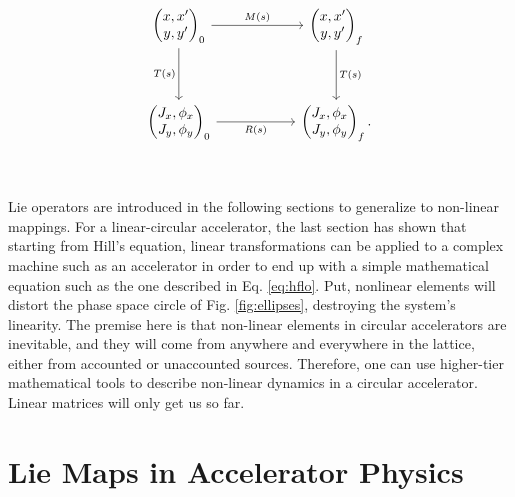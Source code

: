 \begin{equation}\begin{tikzcd}
    {\begin{pmatrix} x,x' \\ y,y' \end{pmatrix}_0} & {} & {\begin{pmatrix} x,x' \\ y,y' \end{pmatrix}_{f}} \\
    \\
    {\begin{pmatrix} J_x,\phi_x \\ J_y,\phi_y \end{pmatrix}_0} & {} & {\begin{pmatrix} J_x,\phi_x \\ J_y,\phi_y \end{pmatrix}_{f}.} \\
    \arrow["{M(s)}", from=1-1, to=1-3]
    \arrow["{T(s)}"', from=1-1, to=3-1]
    \arrow["{R(s)}"', from=3-1, to=3-3]
    \arrow["{T(s)}", from=1-3, to=3-3]
\end{tikzcd}\end{equation}

Lie operators are introduced in the following sections to generalize to non-linear mappings. For a linear-circular accelerator, the last section has shown that starting from Hill's equation, linear transformations can be applied to a complex machine such as an accelerator in order to end up with a simple mathematical equation such as the one described in Eq. \ref{eq:hflo}. Put, nonlinear elements will distort the phase space circle of Fig. \ref{fig:ellipses}, destroying the system's linearity. The premise here is that non-linear elements in circular accelerators are inevitable, and they will come from anywhere and everywhere in the lattice, either from accounted or unaccounted sources. Therefore, one can use higher-tier mathematical tools to describe non-linear dynamics in a circular accelerator. Linear matrices will only get us so far.  

\section{\label{sec:lie}Lie Maps in Accelerator Physics}

